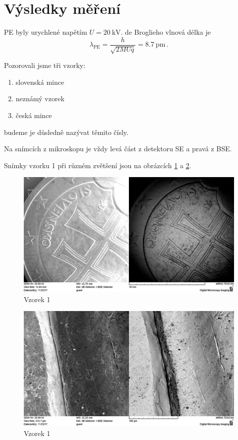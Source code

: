 \section*{Výsledky měření}
PE byly urychlené napětím $U=\SI{20}{\kV}$. de Broglieho vlnová délka je
\begin{equation*}
\lambda_{\text{PE}} = \frac{h}{\sqrt{2MUq}}=\SI{8.7}{\pico\metre} \,.
\end{equation*}

Pozorovali jsme tři vzorky:
\begin{enumerate}[noitemsep]
\item slovenská mince
\item neznámý vzorek
\item česká mince
\end{enumerate}
budeme je důsledně nazývat těmito čísly.

Na snímcích z mikroskopu je vždy levá část z detektoru SE a pravá z BSE.

Snímky vzorku 1 při různém zvětšení jsou na obrázcích \ref{o:vz1_01} a \ref{o:vz1_05}.


\begin{figure}[htbp]
\centering
\includegraphics[width=\textwidth-2cm]{graficos/VZ01_01.png}
\caption{Vzorek 1}
\label{o:vz1_01}
\end{figure}
\begin{figure}[htbp]
\centering
\includegraphics[width=\textwidth-2cm]{graficos/vz01_5.png}
\caption{Vzorek 1}
\label{o:vz1_05}
\end{figure}




